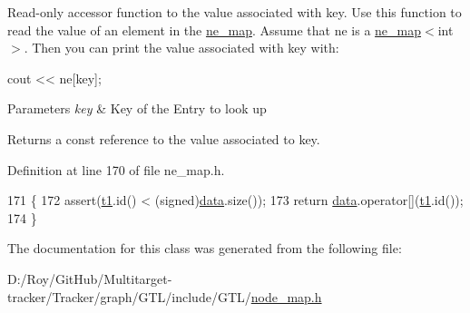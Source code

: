 Read-\/only accessor function to the value associated with {\ttfamily key}. Use this function to read the value of an element in the {\ttfamily \mbox{\hyperlink{classne__map}{ne\+\_\+map}}}. Assume that {\ttfamily ne} is a {\ttfamily \mbox{\hyperlink{classne__map}{ne\+\_\+map}}$<$int$>$}. Then you can print the value associated with {\ttfamily key} with\+: 
\begin{DoxyPre}
  cout << ne[key];
\end{DoxyPre}



\begin{DoxyParams}{Parameters}
{\em key} & Key of the Entry to look up \\
\hline
\end{DoxyParams}
\begin{DoxyReturn}{Returns}
a const reference to the value associated to {\ttfamily key}. 
\end{DoxyReturn}


Definition at line 170 of file ne\+\_\+map.\+h.


\begin{DoxyCode}
171 \{
172     assert(\mbox{\hyperlink{gml2nestedsql_8cpp_a214bd1a0500f5739ce581a8bcffb518a}{t1}}.id() < (signed)\mbox{\hyperlink{classne__map_af73307678e05a9c24c084d98b267afa8}{data}}.size());
173     \textcolor{keywordflow}{return} \mbox{\hyperlink{classne__map_af73307678e05a9c24c084d98b267afa8}{data}}.operator[](\mbox{\hyperlink{gml2nestedsql_8cpp_a214bd1a0500f5739ce581a8bcffb518a}{t1}}.id());
174 \}
\end{DoxyCode}


The documentation for this class was generated from the following file\+:\begin{DoxyCompactItemize}
\item 
D\+:/\+Roy/\+Git\+Hub/\+Multitarget-\/tracker/\+Tracker/graph/\+G\+T\+L/include/\+G\+T\+L/\mbox{\hyperlink{node__map_8h}{node\+\_\+map.\+h}}\end{DoxyCompactItemize}
